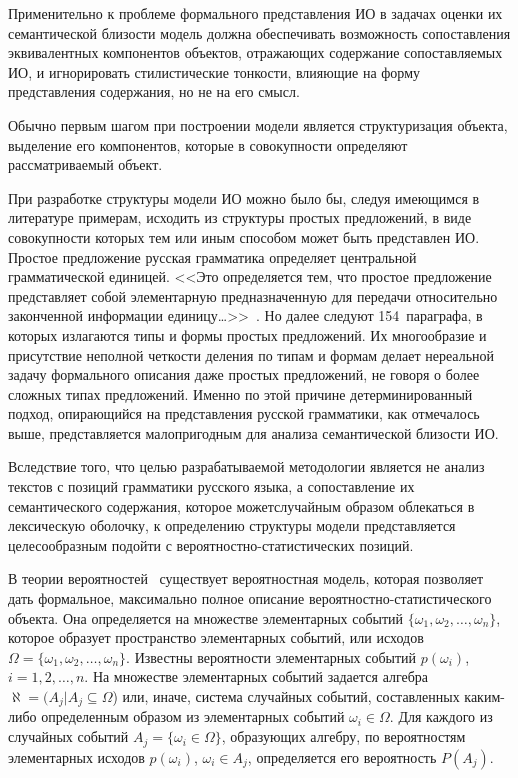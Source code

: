 \begin{multicols}{2}
   Применительно к проблеме формального представления 
ИО в задачах оценки их семантической близости 
модель должна обеспечивать возможность сопоставления эквивалентных 
компонентов объектов, отражающих содержание сопоставляемых ИО, и 
игнорировать стилистические тонкости, влия\-ющие на форму представления 
содержания, но не на его смысл. 
   
   Обычно первым шагом при построении модели является структуризация 
объекта, выделение его компонентов, которые в совокупности определяют 
рассматриваемый объект. 

При разработке структуры модели ИО можно было 
бы, следуя имеющимся в литературе примерам, исходить из структуры 
простых предложений, в виде совокупности которых тем или иным способом 
может быть пред\-став\-лен ИО. Простое предложение русская грамматика 
определяет центральной грамматической единицей. <<Это определяется тем, 
что простое предложение представляет собой элементарную 
предназначенную для передачи относительно законченной информации 
единицу\ldots>>~\cite[с.~405]{8-k}. Но далее следуют 154~параграфа, в 
которых излагаются типы и формы простых предложений. Их многообразие 
и присутствие неполной четкости деления по типам и формам делает 
нереальной задачу формального описания даже простых предложений, не 
говоря о более сложных типах предложений. Именно по этой причине 
детерминированный подход, опирающийся на представления русской 
грамматики, как отмечалось выше, представляется малопригодным для 
анализа семантической бли\-зости ИО. 
   
   Вследствие того, что целью разрабатываемой методологии является не 
анализ текстов с позиций грамматики русского языка, а сопоставление их 
семантического содержания, которое может\linebreak случайным образом облекаться в 
лексическую оболочку, к определению структуры модели пред\-став\-ля\-ет\-ся 
целесообразным подойти с вероятностно-ста\-ти\-сти\-че\-ских позиций. 
   
   В теории вероятностей~\cite{9-k} существует вероятностная модель, 
которая позволяет дать формальное, максимально полное описание 
   ве\-ро\-ят\-но\-ст\-но-ста\-ти\-сти\-че\-ско\-го объекта. Она определяется 
на множестве элементарных событий $\{\omega_1, \omega_2, \ldots , 
\omega_n\}$, которое образует пространство элементарных событий, или 
исходов $\Omega =\{\omega_1, \omega_2, \ldots , \omega_n\}$. Известны 
вероятности элементарных событий $p(\omega_i)$, $i=1, 2, \ldots , n$. На 
множестве элементарных событий задается алгебра $\aleph=(A_j \vert 
A_j\subseteq\Omega$) или, иначе, система случайных событий, составленных 
каким-ли\-бо определенным образом из элементарных событий $\omega_i 
\in\Omega$. Для каждого из случайных событий $A_j=\{\omega_i\in \Omega\}$, 
образующих алгебру, по вероятностям элементарных исходов $p(\omega_i)$, 
$\omega_i\in A_j$, определяется его вероятность $P(A_j)$. 
   

\end{multicols}
